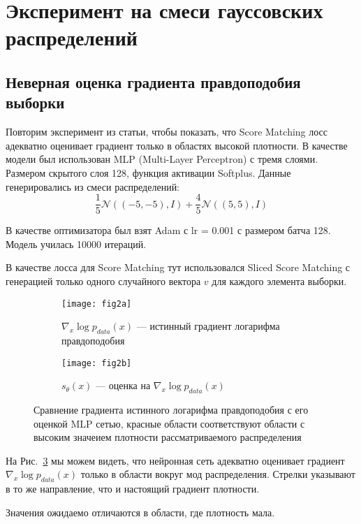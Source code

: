 \documentclass{article}
\begin{document}
\section{Эксперимент на смеси гауссовских распределений}

\subsection{Неверная оценка градиента правдоподобия выборки}
Повторим эксперимент из статьи, чтобы показать, что Score Matching лосс адекватно
оценивает градиент только в областях высокой плотности. В качестве модели был
использован MLP (Multi-Layer Perceptron) с тремя слоями. Размером скрытого слоя
128, функция активации Softplus. Данные генерировались из смеси распределений:
\[
\frac{1}{5} \mathcal{N}\left( \left( -5, -5\right), I \right)+\frac{4}{5} \mathcal{N}\left( \left( 5, 5\right), I \right)
\]

В качестве оптимизатора был взят Adam с lr = 0.001 с размером батча 128. 
Модель училась 10000 итераций.

В качестве лосса для Score Matching тут использовался Sliced Score Matching с
генерацией только одного случайного вектора $v$ для каждого элемента выборки.

\begin{figure}[H]
	\centering
	\begin{subfigure}[b]{0.45\textwidth}
		\texttt{[image: fig2a]}
		\caption{$\nabla_x \log p_{data}(x)$ --- истинный градиент логарифма правдоподобия}
		\label{fig:2a}
	\end{subfigure}
	\begin{subfigure}[b]{0.45\textwidth}
		\centering
		\texttt{[image: fig2b]}
		\caption{$s_{\theta}(x)$ --- оценка на $\nabla_x \log p_{data}(x)$}
		\label{fig:2b}
	\end{subfigure}
	\caption{Сравнение градиента истинного логарифма правдоподобия с его оценкой
		MLP сетью, красные области соответствуют области с высоким значеием плотности
		рассматриваемого распределения}
	\label{fig:2}
\end{figure}

На Рис.~\ref{fig:2} мы можем видеть, что нейронная сеть адекватно оценивает
градиент $\nabla_x \log p_{data}(x)$ только в области вокруг мод распределения.
Стрелки указывают в то же направление, что и настоящий градиент плотности.

Значения ожидаемо отличаются в области, где плотность мала.
\end{document}
